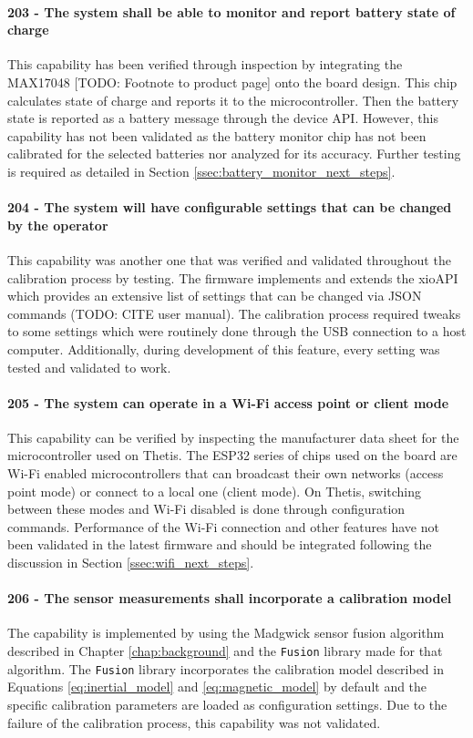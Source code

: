 \paragraph*{203 - The system shall be able to monitor and report battery state of charge} This capability has been verified through inspection by integrating the MAX17048 [TODO: Footnote to product page] onto the board design.
This chip calculates state of charge and reports it to the microcontroller.
Then the battery state is reported as a battery message through the device API.
However, this capability has not been validated as the battery monitor chip has not been calibrated for the selected batteries nor analyzed for its accuracy.
Further testing is required as detailed in Section \ref{ssec:battery_monitor_next_steps}.

\paragraph*{204 - The system will have configurable settings that can be changed by the operator} This capability was another one that was verified and validated throughout the calibration process by testing.
The firmware implements and extends the xioAPI which provides an extensive list of settings that can be changed via JSON commands (TODO: CITE user manual).
The calibration process required tweaks to some settings which were routinely done through the USB connection to a host computer.
Additionally, during development of this feature, every setting was tested and validated to work.

\paragraph*{205 - The system can operate in a Wi-Fi access point or client mode} This capability can be verified by inspecting the manufacturer data sheet for the microcontroller used on Thetis.
The ESP32 series of chips used on the board are Wi-Fi enabled microcontrollers that can broadcast their own networks (access point mode) or connect to a local one (client mode).
On Thetis, switching between these modes and Wi-Fi disabled is done through configuration commands.
Performance of the Wi-Fi connection and other features have not been validated in the latest firmware and should be integrated following the discussion in Section \ref{ssec:wifi_next_steps}.

\paragraph*{206 - The sensor measurements shall incorporate a calibration model} The capability is implemented by using the Madgwick sensor fusion algorithm described in Chapter \ref{chap:background} and the \lstinline[style=customInline]|Fusion| library made for that algorithm.
The \lstinline[style=customInline]|Fusion| library incorporates the calibration model described in Equations \ref{eq:inertial_model} and \ref{eq:magnetic_model} by default and the specific calibration parameters are loaded as configuration settings.
Due to the failure of the calibration process, this capability was not validated.

